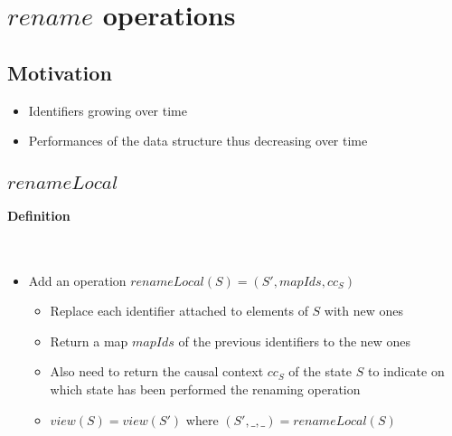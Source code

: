 \documentclass[a4paper]{article}
\begin{document}
\section{$rename$ operations}

\subsection{Motivation}

\begin{itemize}
  \item Identifiers growing over time
  \item Performances of the data structure thus decreasing over time
\end{itemize}

\subsection{$renameLocal$}

\paragraph{Definition}~\\

\begin{itemize}
  \item Add an operation $renameLocal(S) = (S', mapIds, cc_S)$
  \begin{itemize}
    \item Replace each identifier attached to elements of $S$ with new ones
    \item Return a map $mapIds$ of the previous identifiers to the new ones
    \item Also need to return the causal context $cc_S$ of the state $S$
      to indicate on which state has been performed the renaming operation
    \item $view(S) = view(S')$ where $(S', \_, \_) = renameLocal(S)$
  \end{itemize}
\end{itemize}
\end{document}
